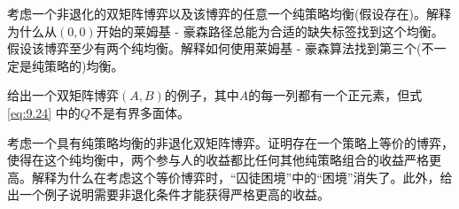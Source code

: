 \begin{exercise}\label{exer:9.4}  %
考虑一个非退化的双矩阵博弈以及该博弈的任意一个纯策略均衡(假设存在)。解释为什么从$(0, 0)$开始的莱姆基 - 豪森路径总能为合适的缺失标签找到这个均衡。假设该博弈至少有两个纯均衡。解释如何使用莱姆基 - 豪森算法找到第三个(不一定是纯策略的)均衡。
\end{exercise}


\begin{exercise}\label{exer:9.5}  %
给出一个双矩阵博弈$(A, B)$的例子，其中\(A\)的每一列都有一个正元素，但式\eqref{eq:9.24}%
中的\(Q\)不是有界多面体。
\end{exercise}


\begin{exercise}\label{exer:9.6}  %
考虑一个具有纯策略均衡的非退化双矩阵博弈。证明存在一个策略上等价的博弈，使得在这个纯均衡中，两个参与人的收益都比任何其他纯策略组合的收益严格更高。解释为什么在考虑这个等价博弈时，“囚徒困境”中的“困境”消失了。此外，给出一个例子说明需要非退化条件才能获得严格更高的收益。
\end{exercise}

